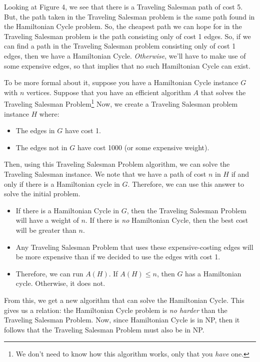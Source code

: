 \documentclass[letterpaper]{article}
\begin{document}
Looking at Figure 4, we see that there is a Traveling Salesman path of cost 5. But, the path taken in the Traveling Salesman problem is the same path found in the Hamiltonian Cycle problem. So, the cheapest path we can hope for in the Traveling Salesman problem is the path consisting only of cost 1 edges. So, if we can find a path in the Traveling Salesman problem consisting only of cost 1 edges, then we have a Hamiltonian Cycle. \emph{Otherwise}, we'll have to make use of some expensive edges, so that implies that no such Hamiltonian Cycle can exist. 


\bigskip 

To be more formal about it, suppose you have a Hamiltonian Cycle instance $G$ with $n$ vertices. Suppose that you have an efficient algorithm $A$ that solves the Traveling Salesman Problem\footnote{We don't need to know how this algorithm works, only that you \emph{have} one.} Now, we create a Traveling Salesman problem instance $H$ where: 
\begin{itemize}
    \item The edges in $G$ have cost 1. 
    \item The edges not in $G$ have cost 1000 (or some expensive weight). 
\end{itemize}
Then, using this Traveling Salesman Problem algorithm, we can solve the Traveling Salesman instance. We note that we have a path of cost $n$ in $H$ if and only if there is a Hamiltonian cycle in $G$. Therefore, we can use this answer to solve the initial problem. 
\begin{itemize}
    \item If there is a Hamiltonian Cycle in $G$, then the Traveling Salesman Problem will have a weight of $n$. If there is \emph{no} Hamiltonian Cycle, then the best cost will be greater than $n$. 
    \item Any Traveling Salesman Problem that uses these expensive-costing edges will be more expensive than if we decided to use the edges with cost 1. 
    \item Therefore, we can run $A(H)$. If $A(H) \leq n$, then $G$ has a Hamiltonian cycle. Otherwise, it does not. 
\end{itemize}
From this, we get a new algorithm that can solve the Hamiltonian Cycle. This gives us a relation: the Hamiltonian Cycle problem is \emph{no harder} than the Traveling Salesman Problem. Now, since Hamiltonian Cycle is in NP, then it follows that the Traveling Salesman Problem must also be in NP. 
\end{document}
